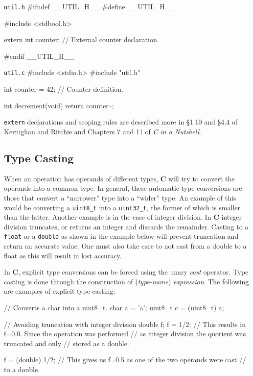 \documentclass[11pt]{article}
\begin{document}
\begin{codelisting}{\texttt{util.h}}
#ifndef __UTIL_H__
#define __UTIL_H__

#include <stdbool.h>

extern int counter; // External counter declaration.

#endif __UTIL_H__
\end{codelisting}

\begin{codelisting}{\texttt{util.c}}
#include <stdio.h>
#include "util.h"

int counter = 42; // Counter definition.

int decrement(void) {
    return counter--;
}
\end{codelisting}

\texttt{extern} declarations and scoping rules are described more in \S 1.10 and
\S 4.4 of Kernighan and Ritchie and Chapters 7 and 11 of \emph{C in a Nutshell}.


\subsection{Type Casting}

When an operation has operands of different types, \textbf{C} will try to
convert the operands into a common type. In general, these automatic type
conversions are those that convert a ``narrower'' type into a ``wider'' type. An
example of this would be converting a \texttt{uint8\_t} into a
\texttt{uint32\_t}, the former of which is smaller than the latter. Another
example is in the case of integer division. In \textbf{C} integer division
truncates, or returns an integer and discards the remainder.  Casting to a
\texttt{float} or a \texttt{double} as shown in the example below will prevent
truncation and return an accurate value. One must also take care to not cast
from a double to a float as this will result in lost accuracy.

In \textbf{C}, explicit type conversions can be forced using the unary
\emph{cast} operator. Type casting is done through the construction of
(\emph{type-name}) \emph{expression}. The following are examples of explicit
type casting:

\begin{codelisting}{}
// Converts a char into a uint8_t.
char a = 'a';
uint8_t c = (uint8_t) a;

// Avoiding truncation with integer division
double f;
f = 1/2;
// This results in f=0.0. Since the operation was performed
// as integer division the quotient was truncated and only
// stored as a double.

f = (double) 1/2;
// This gives us f=0.5 as one of the two operands were cast
// to a double.
\end{codelisting}
\end{document}
